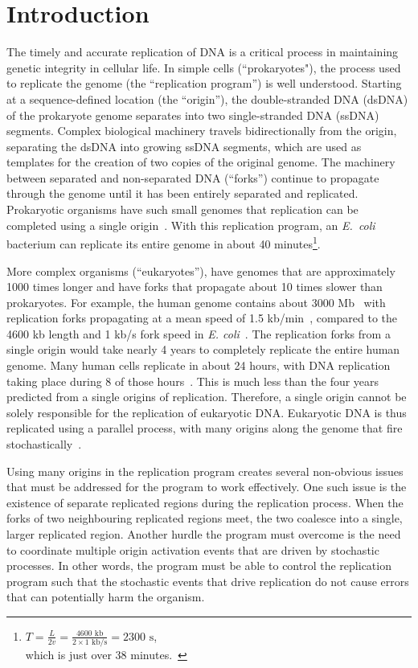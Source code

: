 \chapter{Introduction}
\label{ch:Introduction}

The timely and accurate replication of DNA is a critical process in maintaining genetic integrity in cellular life.
In simple cells (``prokaryotes"), the process used to replicate the genome (the ``replication program'') is well understood.
Starting at a sequence-defined location (the ``origin''), the double-stranded DNA (dsDNA) of the prokaryote genome separates into two single-stranded DNA (ssDNA) segments.
Complex biological machinery travels bidirectionally from the origin, separating the dsDNA into growing ssDNA segments, which are used as templates for the creation of two copies of the original genome.
The machinery between separated and non-separated DNA (``forks'') continue to propagate through the genome until it has been entirely separated and replicated.
Prokaryotic organisms have such small genomes that replication can be completed using a single origin~\cite{MolecularCellBiology}.
With this replication program, an \emph{E.~coli} bacterium can replicate its entire genome in about 40 minutes\footnote{$T=\frac{L}{2v}=\frac{4600\text{ kb}}{2\times1\text{ kb/s}} = 2300\text{ s}$, \\ which is just over 38 minutes.~\cite{EColi}}.

More complex organisms (``eukaryotes''), have genomes that are approximately 1000 times longer and have forks that propagate about 10 times slower than prokaryotes.
For example, the human genome contains about 3000 Mb~\cite{HumanGenomeLength} with replication forks propagating at a mean speed of 1.5 kb/min~\cite{HumanForks}, compared to the 4600 kb length and 1 kb/s fork speed in \emph{E. coli}~\cite{EColi}.
The replication forks from a single origin would take nearly 4 years to completely replicate the entire human genome.
Many human cells replicate in about 24 hours, with DNA replication taking place during 8 of those hours~\cite{CellMolApproach}.
This is much less than the four years predicted from a single origins of replication.
Therefore, a single origin cannot be solely responsible for the replication of eukaryotic DNA.
Eukaryotic DNA is thus replicated using a parallel process, with many origins along the genome that fire stochastically~\cite{eukaryotereview}.

Using many origins in the replication program creates several non-obvious issues that must be addressed for the program to work effectively.
One such issue is the existence of separate replicated regions during the replication process.
When the forks of two neighbouring replicated regions meet, the two coalesce into a single, larger replicated region.
Another hurdle the program must overcome is the need to coordinate multiple origin activation events that are driven by stochastic processes.
In other words, the program must be able to control the replication program such that the stochastic events that drive replication do not cause errors that can potentially harm the organism.~\cite{eukaryotereview}


